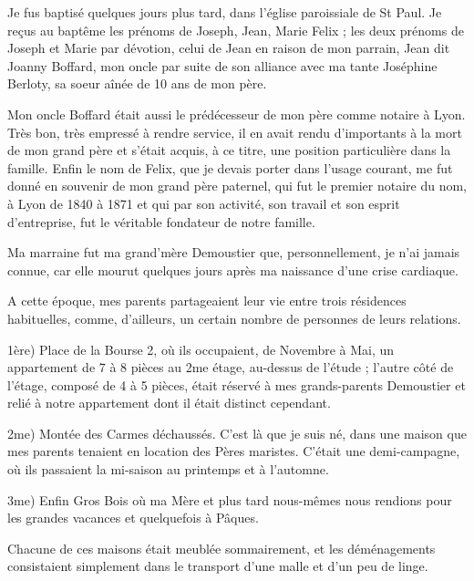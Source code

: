 \documentclass[11pt,a4paper]{report}
\begin{document}
Je fus baptisé quelques jours plus tard, dans l'église paroissiale de St Paul. Je reçus au baptême les prénoms de Joseph, Jean, Marie Felix ; les deux prénoms de Joseph et Marie par dévotion, celui de Jean en raison de mon parrain, Jean dit Joanny Boffard, mon oncle par suite de son alliance avec ma tante Joséphine Berloty, sa soeur aînée de 10 ans de mon père.

Mon oncle Boffard était aussi le prédécesseur de mon père comme notaire à Lyon. Très bon, très empressé à rendre service, il en avait rendu d'importants à la mort de mon grand père et s'était acquis, à ce titre, une position particulière dans la famille. Enfin le nom de Felix, que je devais porter dans l'usage courant, me fut donné en souvenir de mon grand père paternel, qui fut le premier notaire du nom, à Lyon de 1840 à 1871 et qui par son activité, son travail et son esprit d'entreprise, fut le véritable fondateur de notre famille.


Ma marraine fut ma grand'mère Demoustier que, personnellement, je n'ai jamais connue, car elle mourut quelques jours après ma naissance d'une crise cardiaque.

A cette époque, mes parents partageaient leur vie entre trois résidences habituelles, comme, d'ailleurs, un certain nombre de personnes de leurs relations.

1ère) Place de la Bourse 2, où ils occupaient, de Novembre à Mai, un appartement de 7 à 8 pièces au 2me étage, au-dessus de l'étude ; l'autre côté de l'étage, composé de 4 à 5 pièces, était réservé à mes grands-parents Demoustier et relié à notre appartement dont il était distinct cependant.

2me) Montée des Carmes déchaussés. C'est là que je suis né, dans une maison que mes parents tenaient en location des Pères maristes. C'était une demi-campagne, où ils passaient la mi-saison au printemps et à l'automne.

3me) Enfin Gros Bois où ma Mère et plus tard nous-mêmes nous rendions pour les grandes vacances et quelquefois à Pâques.

Chacune de ces maisons était meublée sommairement, et les déménagements consistaient simplement dans le transport d'une malle et d'un peu de linge.
\end{document}
